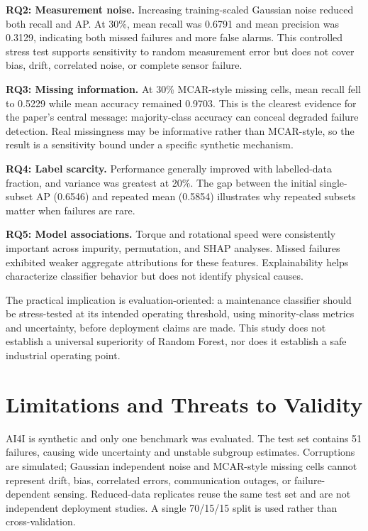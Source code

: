 \documentclass[conference]{IEEEtran}
\begin{document}
\textbf{RQ2: Measurement noise.} Increasing training-scaled Gaussian noise reduced both recall and AP. At 30\%, mean recall was 0.6791 and mean precision was 0.3129, indicating both missed failures and more false alarms. This controlled stress test supports sensitivity to random measurement error but does not cover bias, drift, correlated noise, or complete sensor failure.

\textbf{RQ3: Missing information.} At 30\% MCAR-style missing cells, mean recall fell to 0.5229 while mean accuracy remained 0.9703. This is the clearest evidence for the paper's central message: majority-class accuracy can conceal degraded failure detection. Real missingness may be informative rather than MCAR-style, so the result is a sensitivity bound under a specific synthetic mechanism.

\textbf{RQ4: Label scarcity.} Performance generally improved with labelled-data fraction, and variance was greatest at 20\%. The gap between the initial single-subset AP (0.6546) and repeated mean (0.5854) illustrates why repeated subsets matter when failures are rare.

\textbf{RQ5: Model associations.} Torque and rotational speed were consistently important across impurity, permutation, and SHAP analyses. Missed failures exhibited weaker aggregate attributions for these features. Explainability helps characterize classifier behavior but does not identify physical causes.

The practical implication is evaluation-oriented: a maintenance classifier should be stress-tested at its intended operating threshold, using minority-class metrics and uncertainty, before deployment claims are made. This study does not establish a universal superiority of Random Forest, nor does it establish a safe industrial operating point.

\section{Limitations and Threats to Validity}
AI4I is synthetic and only one benchmark was evaluated. The test set contains 51 failures, causing wide uncertainty and unstable subgroup estimates. Corruptions are simulated; Gaussian independent noise and MCAR-style missing cells cannot represent drift, bias, correlated errors, communication outages, or failure-dependent sensing. Reduced-data replicates reuse the same test set and are not independent deployment studies. A single 70/15/15 split is used rather than cross-validation.
\end{document}

